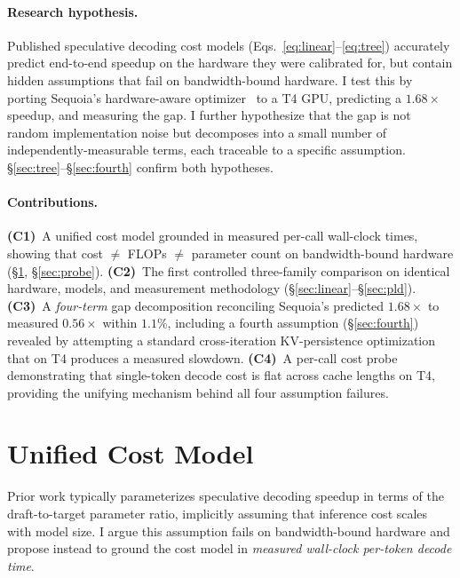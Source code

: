 \documentclass[letterpaper,twocolumn,10pt]{article}
\begin{document}
\paragraph{Research hypothesis.}
Published speculative decoding cost models (Eqs.~\ref{eq:linear}--\ref{eq:tree}) accurately predict end-to-end speedup on the hardware they were calibrated for, but contain hidden assumptions that fail on bandwidth-bound hardware.
I test this by porting Sequoia's hardware-aware optimizer~\cite{chen2024sequoia} to a T4 GPU, predicting a $1.68\times$ speedup, and measuring the gap.
I further hypothesize that the gap is not random implementation noise but decomposes into a small number of independently-measurable terms, each traceable to a specific assumption.
\S\ref{sec:tree}--\S\ref{sec:fourth} confirm both hypotheses.

\paragraph{Contributions.}
\textbf{(C1)}~A unified cost model grounded in measured per-call wall-clock times, showing that cost $\neq$ FLOPs $\neq$ parameter count on bandwidth-bound hardware (\S\ref{sec:cost}, \S\ref{sec:probe}).
\textbf{(C2)}~The first controlled three-family comparison on identical hardware, models, and measurement methodology (\S\ref{sec:linear}--\S\ref{sec:pld}).
\textbf{(C3)}~A \emph{four-term} gap decomposition reconciling Sequoia's predicted $1.68\times$ to measured $0.56\times$ within $1.1\%$, including a fourth assumption (\S\ref{sec:fourth}) revealed by attempting a standard cross-iteration KV-persistence optimization that on T4 produces a measured slowdown.
\textbf{(C4)}~A per-call cost probe demonstrating that single-token decode cost is flat across cache lengths on T4, providing the unifying mechanism behind all four assumption failures.


\section{Unified Cost Model}
\label{sec:cost}

Prior work typically parameterizes speculative decoding speedup in terms of the draft-to-target parameter ratio, implicitly assuming that inference cost scales with model size.
I argue this assumption fails on bandwidth-bound hardware and propose instead to ground the cost model in \emph{measured wall-clock per-token decode time}.
\end{document}
